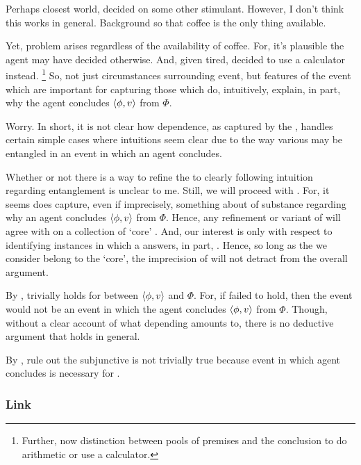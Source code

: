 \begin{note}
  Perhaps closest world, decided on some other stimulant.
  However, I don't think this works in general.
  Background so that coffee is the only thing available.

  Yet, problem arises regardless of the availability of coffee.
  For, it's plausible the agent may have decided otherwise.
  And, given tired, decided to use a calculator instead.%
  \footnote{
    Further, now distinction  between pools of premises and the conclusion to do arithmetic or use a calculator.
  }
  So, not just circumstances surrounding event, but features of the event which are important for capturing those  which do, intuitively, explain, in part, why the agent concludes \(\langle \phi, v \rangle\) from \(\Phi\).

  Worry.
  In short, it is not clear how dependence, as captured by the \qWVitc{}, handles certain simple cases where intuitions seem clear due to the way various  may be entangled in an event in which an agent concludes.

  Whether or not there is a way to refine the \qWVitc{} to clearly following intuition regarding entanglement is unclear to me.
  Still, we will proceed with \qWhyVnP{}.
  For, it seems \qWhyVnP{} does capture, even if imprecisely, something about of substance regarding why an agent concludes \(\langle \phi, v \rangle\) from \(\Phi\).
  Hence, any refinement or variant of \qWhyVnP{} will agree with \qWhyVnP{} on a collection of `core' .
  And, our interest is only with respect to identifying instances in which a \ros{} answers, in part, \qWhyVnP{}.
  Hence, so long as the  we consider belong to the `core', the imprecision of \qWhyVnP{} will not detract from the overall argument.
\end{note}



\begin{note}
  By \supportI{}, trivially holds for \ros{} between \(\langle \phi, v \rangle\) and \(\Phi\).
  For, if \support{} failed to hold, then the event would not be an event in which the agent concludes \(\langle \phi, v \rangle\) from \(\Phi\).
  Though, without a clear account of what depending amounts to, there is no deductive argument that holds in general.

  By \supportII{}, rule out the subjunctive is not trivially true because event in which agent concludes is necessary for \ros{}.
\end{note}

\subsubsection{Link}
\label{cha:var:sec:vars:qwhyvnp:link}

